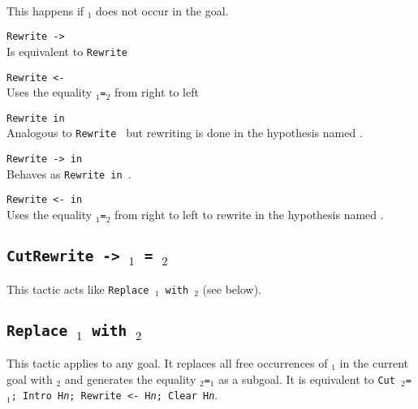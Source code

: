 \begin{ErrMsgs}
\item {}

\item {}\\
This happens if \term$_1$ does not occur in the goal.
\end{ErrMsgs}

\begin{Variants}
\item {\tt Rewrite -> {\term}}\\
  Is equivalent to {\tt Rewrite \term}

\item {\tt Rewrite <- {\term}}\\
  Uses the equality \term$_1${\tt=}\term$_2$ from right to left

\item {\tt Rewrite {\term} in {\ident}}
  \\
  Analogous to  {\tt Rewrite {\term}} but rewriting is done in the
  hypothesis named {\ident}.

\item {\tt Rewrite -> {\term} in {\ident}}
  \\
  Behaves as {\tt Rewrite {\term} in {\ident}}.
 
\item {\tt Rewrite <- {\term} in {\ident}}\\
  Uses the equality \term$_1${\tt=}\term$_2$ from right to left to
  rewrite in the hypothesis named {\ident}.
\end{Variants}


\subsection{\tt CutRewrite -> \term$_1$ = \term$_2$}
\label{CutRewrite}

This tactic acts like {\tt Replace {\term$_1$} with {\term$_2$}}
(see below).

\subsection{\tt Replace {\term$_1$} with {\term$_2$}}
This tactic applies to any goal. It replaces all free occurrences of
{\term$_1$} in the current goal with {\term$_2$} and generates the
equality {\term$_2$}{\tt =}{\term$_1$} as a subgoal. It is equivalent
to {\tt Cut \term$_2$=\term$_1$; Intro H{\sl n}; Rewrite <- H{\sl n}; 
  Clear H{\sl n}}.

